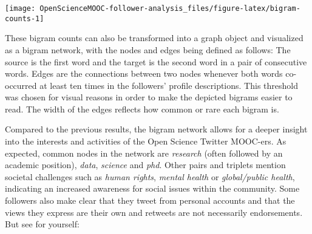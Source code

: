 \documentclass[]{article}
\begin{document}
\begin{center}\texttt{[image: OpenScienceMOOC-follower-analysis\_files/figure-latex/bigram-counts-1]} \end{center}

These bigram counts can also be transformed into a graph object and
visualized as a bigram network, with the nodes and edges being defined
as follows: The source is the first word and the target is the second
word in a pair of consecutive words. Edges are the connections between
two nodes whenever both words co-occurred at least ten times in the
followers' profile descriptions. This threshold was chosen for visual
reasons in order to make the depicted bigrams easier to read. The width
of the edges reflects how common or rare each bigram is.

Compared to the previous results, the bigram network allows for a deeper
insight into the interests and activities of the Open Science Twitter
MOOC-ers. As expected, common nodes in the network are \emph{research}
(often followed by an academic position), \emph{data}, \emph{science}
and \emph{phd}. Other pairs and triplets mention societal challenges
such as \emph{human rights}, \emph{mental health} or \emph{global/public
health}, indicating an increased awareness for social issues within the
community. Some followers also make clear that they tweet from personal
accounts and that the views they express are their own and retweets are
not necessarily endorsements. But see for yourself:
\end{document}
